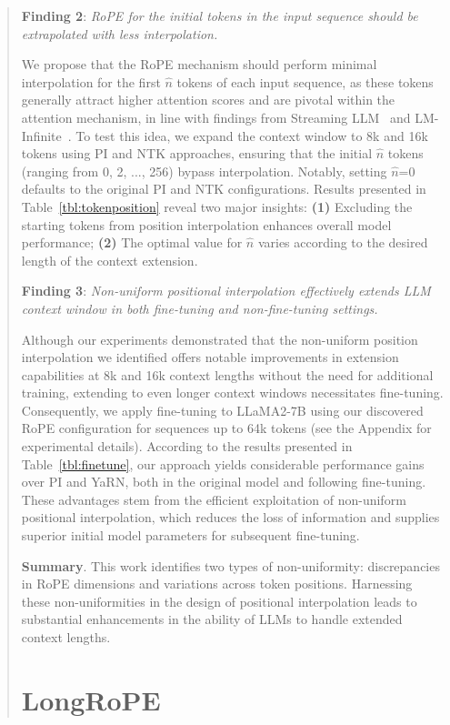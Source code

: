 \begin{abstract}
\textbf{Finding 2}: \textit{RoPE for the initial tokens in the input sequence should be extrapolated with less interpolation.} 

We propose that the RoPE mechanism should perform minimal interpolation for the first $\hat{n}$ tokens of each input sequence, as these tokens generally attract higher attention scores and are pivotal within the attention mechanism, in line with findings from Streaming LLM~\cite{streamingllm} and LM-Infinite~\cite{han2023lminfinite}. To test this idea, we expand the context window to 8k and 16k tokens using PI and NTK approaches, ensuring that the initial $\hat n$ tokens (ranging from 0, 2, ..., 256) bypass interpolation. Notably, setting $\hat n$=0 defaults to the original PI and NTK configurations. Results presented in Table~\ref{tbl:tokenposition} reveal two major insights: \textbf{(1)} Excluding the starting tokens from position interpolation enhances overall model performance; \textbf{(2)} The optimal value for $\hat n$ varies according to the desired length of the context extension.

\textbf{Finding 3}: \textit{Non-uniform positional interpolation effectively extends LLM context window in both fine-tuning and non-fine-tuning settings.} 

Although our experiments demonstrated that the non-uniform position interpolation we identified offers notable improvements in extension capabilities at 8k and 16k context lengths without the need for additional training, extending to even longer context windows necessitates fine-tuning. Consequently, we apply fine-tuning to LLaMA2-7B using our discovered RoPE configuration for sequences up to 64k tokens (see the Appendix for experimental details). According to the results presented in Table~\ref{tbl:finetune}, our approach yields considerable performance gains over PI and YaRN, both in the original model and following fine-tuning. These advantages stem from the efficient exploitation of non-uniform positional interpolation, which reduces the loss of information and supplies superior initial model parameters for subsequent fine-tuning.

\textbf{Summary}. This work identifies two types of non-uniformity: discrepancies in RoPE dimensions and variations across token positions. Harnessing these non-uniformities in the design of positional interpolation leads to substantial enhancements in the ability of LLMs to handle extended context lengths.

\section{LongRoPE}


\end{abstract}
